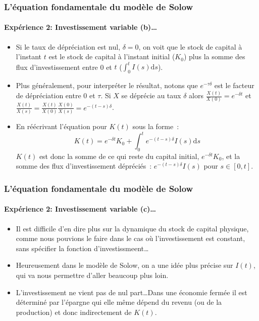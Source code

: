 \documentclass[10pt,notheorems]{beamer}
\theoremstyle{plain}
\theoremstyle{definition} %
\begin{document}
\begin{frame}
  \frametitle{L'équation fondamentale du modèle de Solow}
  \framesubtitle{Expérience 2: Investissement variable (b)\ldots}

  \begin{itemize}

  \item Si le taux de dépréciation est nul, $\delta=0$, on voit que le stock de capital à l'instant $t$ est le stock de capital à l'instant initial ($K_0$) plus la somme des flux d'investissement entre 0 et $t$ ($\int_0^tI(s)\mathrm ds$).\newline

  \item Plus généralement, pour interpréter le résultat, notons que $e^{-\tau \delta}$ est le facteur de dépréciation entre 0 et $\tau$. Si $X$ se déprécie au taux $\delta$ alors $\frac{X(t)}{X(0)}=e^{-\delta t}$ et $\frac{X(t)}{X(s)} = \frac{X(t)}{X(0)}\frac{X(0)}{X(s)} = e^{-(t-s)\delta}$.\newline

  \item En réécrivant l'équation pour $K(t)$ sous la forme~:
    \[
      K(t) = e^{-\delta t}K_0 + \int_0^te^{-(t-s)\delta}I(s)\mathrm ds
    \]
    $K(t)$ est donc la somme de ce qui reste du capital initial, $e^{-\delta t}K_0$, et la somme des flux d'investissement dépréciés~: $e^{-(t-s)\delta}I(s)$ pour $s\in[0,t]$.
  \end{itemize}

\end{frame}


\begin{frame}
  \frametitle{L'équation fondamentale du modèle de Solow}
  \framesubtitle{Expérience 2: Investissement variable (c)\ldots}

  \begin{itemize}

  \item Il est difficile d'en dire plus sur la dynamique du stock de capital physique, comme nous pouvions le faire dans le cas où l'investissement est constant, sans spécifier la fonction d'investissmeent\ldots\newline

  \item Heureusement dans le modèle de Solow, on a une idée plus précise sur $I(t)$, qui va nous permettre d'aller beaucoup plus loin.\newline

  \item L'investissement ne vient pas de nul part\ldots Dans une économie fermée il est déterminé par l'épargne qui elle même dépend du revenu (ou de la production) et donc indirectement de $K(t)$.\newline

  \end{itemize}

\end{frame}
\end{document}
